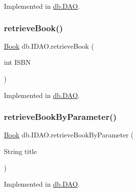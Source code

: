 Implemented in \hyperlink{classdb_1_1_d_a_o_a3b627b7177990799fd02e0c38b8adb70}{db.\+D\+AO}.

\mbox{\label{interfacedb_1_1_i_d_a_o_a1457ecf91799eaacd17cd3259826fc36}} 
\subsubsection{\texorpdfstring{retrieve\+Book()}{retrieveBook()}}
{\footnotesize\ttfamily \hyperlink{classserver_1_1data_1_1_book}{Book} db.\+I\+D\+A\+O.\+retrieve\+Book (\begin{DoxyParamCaption}\item[{int}]{I\+S\+BN }\end{DoxyParamCaption})}



Implemented in \hyperlink{classdb_1_1_d_a_o_ade778f907d0a74dc27c4fc03f8709815}{db.\+D\+AO}.

\mbox{\label{interfacedb_1_1_i_d_a_o_a4c5eda35bfbba1b0a994efe00f99a544}} 
\subsubsection{\texorpdfstring{retrieve\+Book\+By\+Parameter()}{retrieveBookByParameter()}}
{\footnotesize\ttfamily \hyperlink{classserver_1_1data_1_1_book}{Book} db.\+I\+D\+A\+O.\+retrieve\+Book\+By\+Parameter (\begin{DoxyParamCaption}\item[{String}]{title }\end{DoxyParamCaption})}



Implemented in \hyperlink{classdb_1_1_d_a_o_a1f8580da682f8a8af4896c491c3b6611}{db.\+D\+AO}.

\mbox{\label{interfacedb_1_1_i_d_a_o_a53fd20610d94f7c5f0f713dad7528c26}} 
